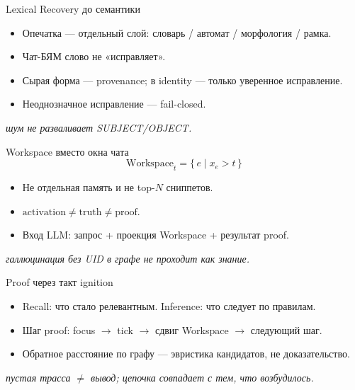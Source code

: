 \documentclass[aspectratio=169,11pt]{beamer}
\newcommand{\Lift}[1]{%
  {\scriptsize\textit{#1}}%
}
\begin{document}
\begin{frame}{Lexical Recovery до семантики}
\begin{itemize}
  \item Опечатка --- отдельный слой: словарь / автомат / морфология / рамка.
  \item Чат-БЯМ слово не «исправляет».
  \item Сырая форма --- provenance; в identity --- только уверенное исправление.
  \item Неоднозначное исправление --- fail-closed.
\end{itemize}
\Lift{шум не разваливает SUBJECT/OBJECT.}
\end{frame}

\begin{frame}{Workspace вместо окна чата}
\[
\mathrm{Workspace}_t = \{\, e \mid x_e > t \,\}
\]
\begin{itemize}
  \item Не отдельная память и не top-$N$ сниппетов.
  \item $\mathrm{activation} \neq \mathrm{truth} \neq \mathrm{proof}$.
  \item Вход LLM: запрос + проекция Workspace + результат proof.
\end{itemize}
\Lift{галлюцинация без UID в графе не проходит как знание.}
\end{frame}

\begin{frame}{Proof через такт ignition}
\begin{itemize}
  \item Recall: что стало релевантным. Inference: что следует по правилам.
  \item Шаг proof: focus $\to$ tick $\to$ сдвиг Workspace $\to$ следующий шаг.
  \item Обратное расстояние по графу --- эвристика кандидатов, не доказательство.
\end{itemize}
\vspace{0.35em}
\begin{center}
\end{center}
\Lift{пустая трасса $\neq$ вывод; цепочка совпадает с тем, что возбудилось.}
\end{frame}
\end{document}
